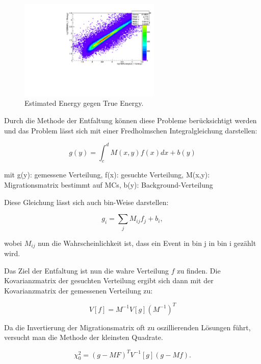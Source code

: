 \begin{figure}
    \centering
    \includegraphics[width=0.6\textwidth]{./Plots/EnergyEst_EnergyTrue.pdf}
    \caption{Estimated Energy gegen True Energy.}
    \label{EnergyEst_EnergyTrue}
\end{figure}

Durch die Methode der Entfaltung können diese Probleme berücksichtigt werden und das Problem lässt sich mit einer Fredholmschen Integralgleichung darstellen:

\begin{equation}
 g(y)= \int_c^d M(x,y) f(x) dx + b(y)
\end{equation}

mit g(y): gemessene Verteilung, f(x): gesuchte Verteilung, M(x,y): Migrationsmatrix bestimmt auf MCs, b(y): Background-Verteilung

Diese Gleichung lässt sich auch bin-Weise darstellen:

\begin{equation}
 g_i=\sum_j M_{ij}f_j+b_i,
\end{equation}

wobei $M_{ij}$ nun die Wahrscheinlichkeit ist, dass ein Event in bin j in bin i gezählt wird.

Das Ziel der Entfaltung ist nun die wahre Verteilung $f$ zu finden.
Die Kovarianzmatrix der gesuchten Verteilung ergibt sich dann mit der Kovarianzmatrix der gemessenen Verteilung zu:

\begin{equation}
 V[f]=M^{-1}V[g](M^{-1})^T
\end{equation}

Da die Invertierung der Migrationsmatrix oft zu oszillierenden Lösungen führt, versucht man die Methode der kleinsten Quadrate.

\begin{equation}
 \chi_0^2=(g-MF)^T V^{-1}[g](g-Mf).
\end{equation}

